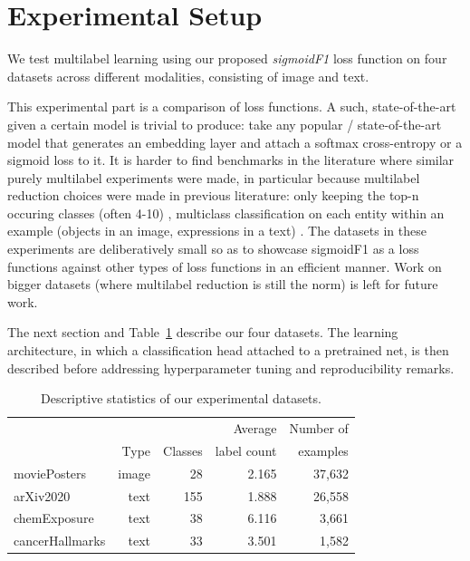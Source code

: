 
\section{Experimental Setup}
\label{sec:orgb44ba25}

We test multilabel learning using our proposed \emph{sigmoidF1} loss function on four datasets across different modalities, consisting of image and text.

This experimental part is a comparison of loss functions. A such, state-of-the-art given a certain model is trivial to produce: take any popular / state-of-the-art model that generates an embedding layer and attach a softmax cross-entropy or a sigmoid loss to it. It is harder to find benchmarks in the literature where similar purely multilabel experiments were made, in particular because multilabel reduction choices were made in previous literature: only keeping the top-n occuring classes (often 4-10) , multiclass classification on each entity within an example (objects in an image, expressions in a text) . The datasets in these experiments are deliberatively small so as to showcase sigmoidF1 as a loss functions against other types of loss functions in an efficient manner. Work on bigger datasets (where multilabel reduction is still the norm) is left for future work.

The next section and Table~\ref{table:datasets} describe our four datasets. The learning architecture, in which a classification head attached to a pretrained net, is then described before addressing hyperparameter tuning and reproducibility remarks.

\begin{table}[b]
\caption{Descriptive statistics of our experimental datasets.}
\label{table:datasets}
\centering
\begin{tabular}{l rrrr}
\toprule
& & & Average & Number of \\
& Type & Classes & label count & examples \\
\midrule
moviePosters & image & 28 & 2.165 & 37,632\\
arXiv2020 & text & 155 & 1.888 & 26,558\\
chemExposure & text & 38 & 6.116 & 3,661\\
cancerHallmarks\hspace{-.7em}  & text & 33 & 3.501 & 1,582\\
\bottomrule
\end{tabular}
\end{table}

